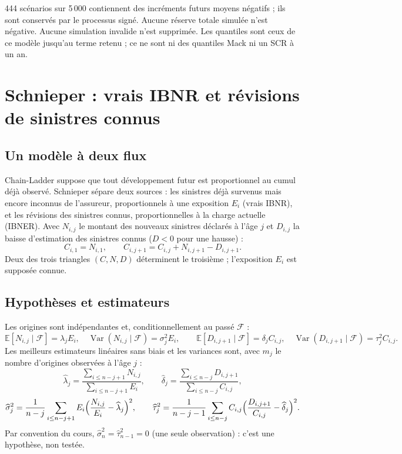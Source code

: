 \documentclass[11pt,a4paper]{article}
\newcommand{\E}{\mathbb E}
\newcommand{\Var}{\operatorname{Var}}
\begin{document}
\begin{limitbox}
444 scénarios sur 5\,000 contiennent des incréments futurs moyens négatifs ; ils sont conservés par le processus signé. Aucune réserve totale simulée n'est négative. Aucune simulation invalide n'est supprimée. Les quantiles sont ceux de ce modèle jusqu'au terme retenu ; ce ne sont ni des quantiles Mack ni un SCR à un an.
\end{limitbox}

\newpage
\section{Schnieper : vrais IBNR et révisions de sinistres connus}\label{sec:schnieper}
\subsection*{Un modèle à deux flux}
Chain-Ladder suppose que tout développement futur est proportionnel au cumul déjà observé. Schnieper sépare deux sources : les sinistres déjà survenus mais encore inconnus de l'assureur, proportionnels à une exposition $E_i$ (vrais IBNR), et les révisions des sinistres connus, proportionnelles à la charge actuelle (IBNER). Avec $N_{i,j}$ le montant des nouveaux sinistres déclarés à l'âge $j$ et $D_{i,j}$ la baisse d'estimation des sinistres connus ($D<0$ pour une hausse) :
\[
\boxed{C_{i,1}=N_{i,1},\qquad C_{i,j+1}=C_{i,j}+N_{i,j+1}-D_{i,j+1}.}
\]
Deux des trois triangles $(C,N,D)$ déterminent le troisième ; l'exposition $E_i$ est supposée connue.

\subsection*{Hypothèses et estimateurs}
Les origines sont indépendantes et, conditionnellement au passé $\mathcal F$ :
\[
\E[N_{i,j}\mid\mathcal F]=\lambda_jE_i,\quad \Var(N_{i,j}\mid\mathcal F)=\sigma_j^2E_i,\qquad
\E[D_{i,j+1}\mid\mathcal F]=\delta_jC_{i,j},\quad \Var(D_{i,j+1}\mid\mathcal F)=\tau_j^2C_{i,j}.
\]
Les meilleurs estimateurs linéaires sans biais et les variances sont, avec $m_j$ le nombre d'origines observées à l'âge $j$ :
\[
\widehat\lambda_j=\frac{\sum_{i\le n-j+1}N_{i,j}}{\sum_{i\le n-j+1}E_i},\qquad
\widehat\delta_j=\frac{\sum_{i\le n-j}D_{i,j+1}}{\sum_{i\le n-j}C_{i,j}},
\]
\[
\widehat\sigma_j^2=\frac1{n-j}\sum_{i\le n-j+1}E_i\Bigl(\frac{N_{i,j}}{E_i}-\widehat\lambda_j\Bigr)^2,\qquad
\widehat\tau_j^2=\frac1{n-j-1}\sum_{i\le n-j}C_{i,j}\Bigl(\frac{D_{i,j+1}}{C_{i,j}}-\widehat\delta_j\Bigr)^2 .
\]
Par convention du cours, $\widehat\sigma_n^2=\widehat\tau_{n-1}^2=0$ (une seule observation) : c'est une hypothèse, non testée.
\end{document}
